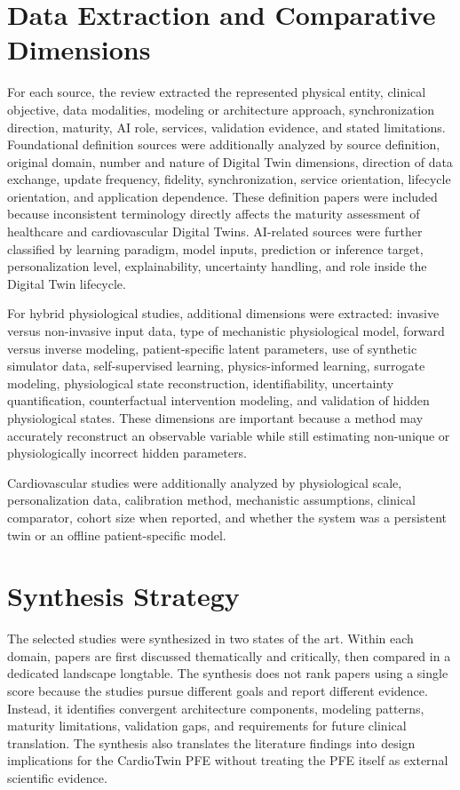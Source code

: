 \section{Data Extraction and Comparative Dimensions}
For each source, the review extracted the represented physical entity, clinical objective, data modalities, modeling or architecture approach, synchronization direction, maturity, AI role, services, validation evidence, and stated limitations. Foundational definition sources were additionally analyzed by source definition, original domain, number and nature of Digital Twin dimensions, direction of data exchange, update frequency, fidelity, synchronization, service orientation, lifecycle orientation, and application dependence. These definition papers were included because inconsistent terminology directly affects the maturity assessment of healthcare and cardiovascular Digital Twins. AI-related sources were further classified by learning paradigm, model inputs, prediction or inference target, personalization level, explainability, uncertainty handling, and role inside the Digital Twin lifecycle.

For hybrid physiological studies, additional dimensions were extracted: invasive versus non-invasive input data, type of mechanistic physiological model, forward versus inverse modeling, patient-specific latent parameters, use of synthetic simulator data, self-supervised learning, physics-informed learning, surrogate modeling, physiological state reconstruction, identifiability, uncertainty quantification, counterfactual intervention modeling, and validation of hidden physiological states. These dimensions are important because a method may accurately reconstruct an observable variable while still estimating non-unique or physiologically incorrect hidden parameters.

Cardiovascular studies were additionally analyzed by physiological scale, personalization data, calibration method, mechanistic assumptions, clinical comparator, cohort size when reported, and whether the system was a persistent twin or an offline patient-specific model.

\section{Synthesis Strategy}
The selected studies were synthesized in two states of the art. Within each domain, papers are first discussed thematically and critically, then compared in a dedicated landscape longtable. The synthesis does not rank papers using a single score because the studies pursue different goals and report different evidence. Instead, it identifies convergent architecture components, modeling patterns, maturity limitations, validation gaps, and requirements for future clinical translation. The synthesis also translates the literature findings into design implications for the CardioTwin PFE without treating the PFE itself as external scientific evidence.

